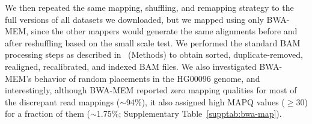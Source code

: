 \documentclass[10pt,a4paper]{article}
\begin{document}
We then repeated the same mapping, shuffling, and remapping strategy to the full versions of all datasets we downloaded, but we mapped using only BWA-MEM, since the other mappers 
would generate the same alignments before and after reshuffling based on the small scale test. We performed the standard BAM processing steps as described 
in~\cite{VanderAuwera2013} (Methods) to obtain sorted, duplicate-removed, realigned, recalibrated, and indexed BAM files. We also investigated BWA-MEM's behavior of random placements in the
HG00096 genome, and interestingly, although BWA-MEM reported zero mapping qualities for 
most of the discrepant read mappings ($\sim$94\%), it also assigned high MAPQ values ($\geq$30) for a fraction of them ($\sim$1.75\%; Supplementary Table~\ref{supptab:bwa-map}). 


\end{document}

